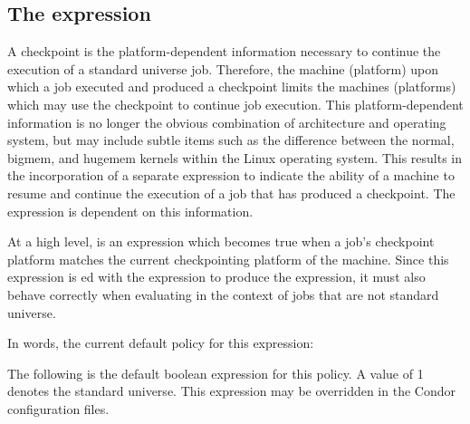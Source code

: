 \subsection{\label{sec:Is-Valid-Checkpoint-Platform}The  expression}

A checkpoint is the platform-dependent information necessary
to continue the execution of a standard universe job.
Therefore, the machine (platform) upon which a job executed
and produced a checkpoint limits the machines (platforms)
which may use the checkpoint to continue job execution.
This platform-dependent information is no longer
the obvious combination of architecture and operating system, 
but may include subtle items such as the 
difference between the normal, bigmem, and hugemem kernels
within the Linux operating system.
This results in the incorporation of a separate
expression to indicate the ability of a machine to
resume and continue the execution of a job that has produced
a checkpoint.
The  expression is dependent on this information.

At a high level,  is an expression
which becomes true when a job's checkpoint platform matches the
current checkpointing platform of the machine. 
Since this expression is ed with the  expression
to produce the  expression,
it must also behave correctly when evaluating in the context of jobs
that are not standard universe.

In words,
the current default policy for this expression:


The following  is the default boolean expression for this
policy.
A  value of 1 denotes the standard universe.
This expression  may be
overridden in the Condor configuration files.

